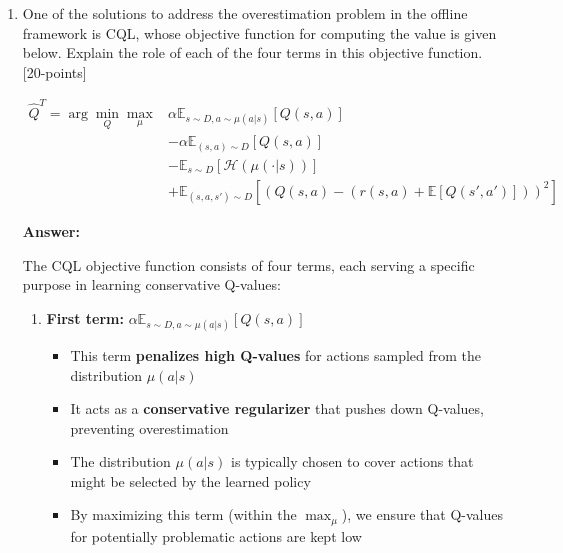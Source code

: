 \documentclass[12pt]{article}
\begin{document}
{{\begin{enumerate}
\begin{enumerate}
        \item \textbf{Limited Data Coverage:} The dataset may not cover all relevant state-action pairs, leading to uncertainty about the true Q-values for uncovered regions. Without proper regularization, the learned Q-function may assign unrealistically high values to these regions.
    \end{enumerate}
    
    This overestimation is particularly dangerous in offline RL because the agent cannot interact with the environment to correct these errors through exploration, making the learned policy potentially unsafe or suboptimal.

    \item One of the solutions to address the overestimation problem in the offline framework is CQL, whose objective function for computing the value is given below. Explain the role of each of the four terms in this objective function. [20-points]

    \begin{align*}
    \hat{Q}^T = \arg \min_{Q} \max_{\mu} 
        & \alpha \mathbb{E}_{s \sim D, a \sim \mu(a|s)} [Q(s,a)] \\
        & - \alpha \mathbb{E}_{(s,a) \sim D} [Q(s,a)] \\
        & - \mathbb{E}_{s \sim D} [\mathcal{H}(\mu(\cdot|s))] \\
        & + \mathbb{E}_{(s,a,s') \sim D} \left[ (Q(s,a) - (r(s,a) + \mathbb{E}[Q(s',a')]))^2 \right]
    \end{align*}
    
    \textbf{Answer:}
    
    The CQL objective function consists of four terms, each serving a specific purpose in learning conservative Q-values:
    
    \begin{enumerate}
        \item \textbf{First term:} $\alpha \mathbb{E}_{s \sim D, a \sim \mu(a|s)} [Q(s,a)]$
        \begin{itemize}
            \item This term \textbf{penalizes high Q-values} for actions sampled from the distribution $\mu(a|s)$
            \item It acts as a \textbf{conservative regularizer} that pushes down Q-values, preventing overestimation
            \item The distribution $\mu(a|s)$ is typically chosen to cover actions that might be selected by the learned policy
            \item By maximizing this term (within the $\max_{\mu}$), we ensure that Q-values for potentially problematic actions are kept low
        \end{itemize}
        

\end{enumerate}
\end{enumerate}}}
\end{document}
